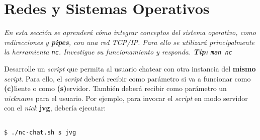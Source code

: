 \section{Redes y Sistemas Operativos}

\textit{En esta sección se aprenderá cómo integrar conceptos del sistema
  operativo, como redirecciones y \textbf{pipes}, con una red TCP/IP. Para
  ello se utilizará principalmente la herramienta
  \texttt{nc}. Investigue su funcionamiento y responda. \textbf{Tip:} \texttt{man nc}}

\begin{questions}
  \question Desarrolle un \textit{script} que permita al usuario chatear
  con otra instancia del \textbf{mismo} \textit{script}. Para ello, el
  \textit{script} deberá recibir como parámetro si va a funcionar como
  \textbf{(c)}liente o como \textbf{(s)}ervidor. También deberá recibir
  como parámetro un \textit{nickname} para el usuario. Por ejemplo, para
  invocar el \textit{script} en modo servidor con el \textit{nick}
  \textbf{jvg}, debería ejecutar:
  \begin{lstlisting}

$ ./nc-chat.sh s jvg
  \end{lstlisting}

\end{questions}
